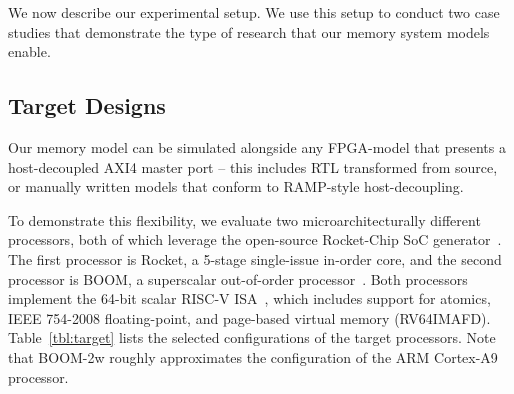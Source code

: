 We now describe our experimental setup. We use this setup to conduct two case studies that demonstrate the type of research that our memory system models enable.

\subsection{Target Designs}

\begin{table}[htbp]
\begin{center}
\end{center}
\caption{Processor Parameters}
\label{tbl:target}
\end{table}%

Our memory model can be simulated alongside any FPGA-model that presents a
host-decoupled AXI4 master port -- this includes RTL transformed from source,
or manually written models that conform to RAMP-style host-decoupling.

To demonstrate this flexibility, we evaluate two microarchitecturally different processors, both
of which leverage the open-source Rocket-Chip SoC generator~\cite{rocketchip}. The first
processor is Rocket, a 5-stage single-issue in-order core, and the second processor is BOOM, a
superscalar out-of-order processor~\cite{boom}. Both processors implement the 64-bit scalar
RISC-V ISA~\cite{Waterman:EECS-2016-118, Waterman:EECS-2016-161}, which includes support for
atomics, IEEE 754-2008 floating-point, and page-based virtual memory (RV64IMAFD).
Table~\ref{tbl:target} lists the selected configurations of the target processors. Note that
BOOM-2w roughly approximates the configuration of the ARM Cortex-A9 processor.

